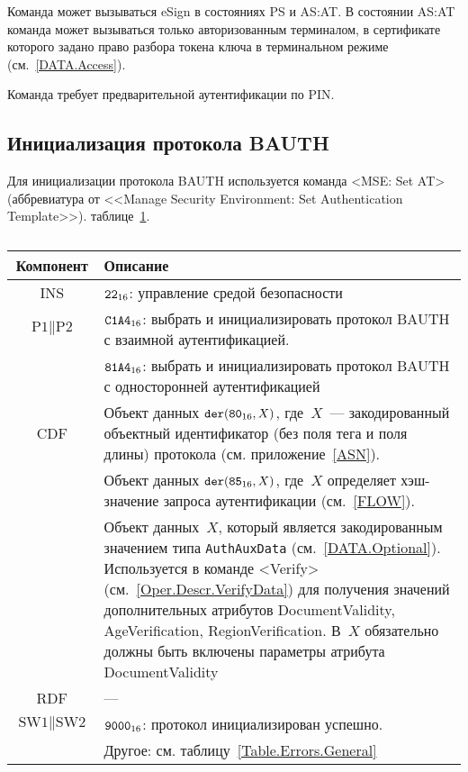 Команда может вызываться  eSign в 
состояниях PS и AS:AT. В состоянии AS:AT команда 
может вызываться только авторизованным терминалом,
в сертификате которого задано право 
разбора токена ключа в терминальном режиме (см.~\ref{DATA.Access}).

Команда требует предварительной аутентификации по PIN. 

\subsection{Инициализация протокола BAUTH}
\label{Oper.Descr.SetBAUTH}

Для инициализации протокола BAUTH используется команда <MSE: Set AT> 
(аббревиатура от <<Manage Security Environment: Set Authentication Template>>).
 таблице~\ref{Table.Oper.SetBAUTHCmd}.

\begin{table}[hbt]
\caption{}\label{Table.Oper.SetBAUTHCmd}
\begin{tabular}{|c|p{14cm}|}
\hline
Компонент & Описание \\
\hline
\hline
INS & $\texttt{22}_{16}$: управление средой безопасности\\ 
\hline
$\text{P1} \parallel\text{P2}$ & $\texttt{C1A4}_{16}$: выбрать и 
инициализировать протокол BAUTH с взаимной 
аутентификацией.\\ 
 & $\texttt{81A4}_{16}$: выбрать и инициализировать протокол BAUTH с 
односторонней аутентификацией\\
\hline
CDF & Объект данных 
$\texttt{der}(\texttt{80}_{16}, X)$, где~$X$~--- 
закодированный объектный идентификатор (без поля тега и поля 
длины) протокола (см. приложение~\ref{ASN}).\\
 & Объект данных $\texttt{der}(\texttt{85}_{16}, X)$, 
где~$X$ определяет хэш-значение запроса аутентификации (см.~\ref{FLOW}).\\
 & Объект данных~$X$, который является 
закодированным значением типа \verb|AuthAuxData| (см.~\ref{DATA.Optional}). 
Используется в команде <Verify> (см.~\ref{Oper.Descr.VerifyData}) 
для получения значений дополнительных атрибутов DocumentValidity, 
AgeVerification, RegionVerification. В~$X$ 
обязательно должны быть включены параметры атрибута DocumentValidity\\
\hline 
RDF &  --- \\
\hline
$\text{SW1} \parallel \text{SW2}$ & 
$\texttt{9000}_{16}$: протокол инициализирован успешно. \\
  & Другое: см. таблицу~\ref{Table.Errors.General}\\
\hline
\end{tabular}
\end{table}

